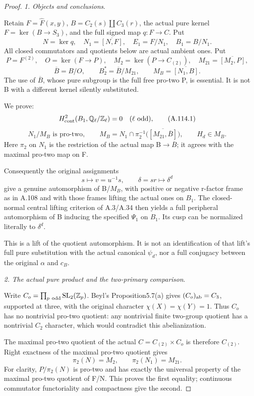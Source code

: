 \begin{proof}
\medskip\noindent\emph{1. Objects and conclusions}.

Retain \(F=\widehat F(x,y)\), \(B=C_2(s)\amalg C_3(r)\), the actual pure kernel \(F=\ker(B\to S_3)\), and the full signed map \(q:F\to C\). Put
\[
N=\ker q,\quad N_1=\overline{[N,F]},\quad
E_1=F/N_1,\quad B_1=B/N_1.
\]
All closed commutators and quotients below are actual ambient ones. Put
\[
P=F^{(2)},\quad O=\ker(F\to P),\quad
M_2=\ker(P\to C_{(2)}),\quad M_{21}=\overline{[M_2,P]},
\]
\[
\overline B=B/O,\qquad B_2^*=\overline B/M_{21},\qquad
M_B=\overline{[N_1,B]}.
\]
The use of \(\overline B\), whose pure subgroup is the full free pro-two P, is essential. It is not B with a different kernel silently substituted.

We prove:
\[
H^2_{\rm cont}(B_1,\mathbb Q_\ell/\mathbb Z_\ell)=0
\quad(\ell\text{ odd}),                                      \tag{A.114.1}
\]
\[
N_1/M_B\text{ is pro-two},\qquad
M_B=N_1\cap\pi_2^{-1}\bigl(\overline{[M_{21},\overline B]}\bigr),
\qquad H_d\in M_B.                                            \tag{A.114.2}
\]
Here \(\pi_2\) on \(N_1\) is the restriction of the actual map B\(\to\)\(\overline B\); it agrees with the maximal pro-two map on F.

Consequently the original assignments
\[
s\mapsto v=u^{-1}s,\qquad \delta=sr\mapsto\delta^d
\]
give a genuine automorphism of B/\(M_B\), with positive or negative r-factor frame as in A.108 and with those frames lifting the actual ones on \(B_1\). The closed-normal central lifting criterion of A.3/A.34 then yields a full peripheral automorphism of B inducing the specified \(\Psi_1\) on \(B_1\). Its cusp can be normalized literally to \(\delta^d\).

This is a lift of the quotient automorphism. It is not an identification of that lift's full pure substitution with the actual canonical \(\psi_d\), nor a full conjugacy between the original \(\alpha\) and \(c_B\).

\medskip\noindent\emph{2. The actual pure product and the two-primary comparison}.

Write \(C_o=\prod_{p\ {\rm odd}}\operatorname{SL}_2(\mathbb Z_p)\).
Beyl's Proposition5.7(a) gives \((C_o)_{\rm ab}=C_3\), supported at three, with the original character \(\chi(X)=\chi(Y)=1\). Thus \(C_o\) has no nontrivial pro-two quotient: any nontrivial finite two-group quotient has a nontrivial \(C_2\) character, which would contradict this abelianization.

The maximal pro-two quotient of the actual \(C=C_{(2)}\times C_o\) is therefore \(C_{(2)}\). Right exactness of the maximal pro-two quotient gives
\[
\pi_2(N)=M_2,\qquad \pi_2(N_1)=M_{21}.                         \tag{A.114.3}
\]
For clarity, \(P/\pi_2(N)\) is pro-two and has exactly the universal property of the maximal pro-two quotient of F/N. This proves the first equality; continuous commutator functoriality and compactness give the second.


\end{proof}
